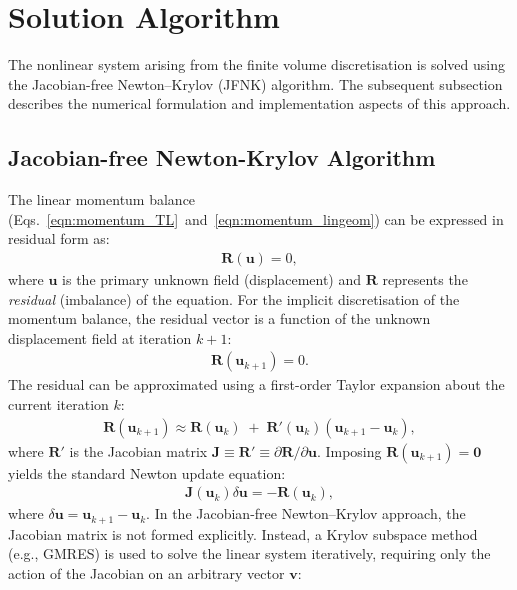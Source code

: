 \documentclass[review,3p]{elsarticle}
\newcommand{\bb}{\boldsymbol}
\begin{document}
\section{Solution Algorithm}
\label{sec:Sol_Alg}
%
%
The nonlinear system arising from the finite volume discretisation is solved using the Jacobian-free Newton–Krylov (JFNK) algorithm.
The subsequent subsection describes the numerical formulation and implementation aspects of this approach.
%
\subsection{Jacobian-free Newton-Krylov Algorithm}
\label{sec:JFNK_alg}
%
The linear momentum balance (Eqs.~\eqref{eqn:momentum_TL}~and~\eqref{eqn:momentum_lingeom}) can be expressed in residual form as:
%
\begin{eqnarray}
	\bb{R}(\bb{u}) = 0,
\end{eqnarray}
%
where $\bb{u}$ is the primary unknown field (displacement) and $\bb{R}$ represents the \emph{residual} (imbalance) of the equation.
For the implicit discretisation of the momentum balance, the residual vector is a function of the unknown displacement field at iteration $k+1$:
%
\begin{eqnarray}
	\bb{R}(\bb{u}_{k+1}) = 0.
\end{eqnarray}
%
The residual can be approximated using a first-order Taylor expansion about the current iteration $k$:
%
\begin{eqnarray}
	\bb{R}(\bb{u}_{k+1}) \approx \bb{R}(\bb{u}_{k}) \;+\;  \bb{R}'(\bb{u}_{k}) (\bb{u}_{k+1} - \bb{u}_{k}),
\end{eqnarray}
%
where $\bb{R}'$ is the Jacobian matrix $\bb{J}\equiv\bb{R}'\equiv\partial \bb{R} / \partial \bb{u}$.
Imposing $\bb{R}(\bb{u}_{k+1}) = \bb{0}$ yields the standard Newton update equation:
%
\begin{eqnarray}
	\bb{J}(\bb{u}_k) \delta \bb{u} = -\bb{R}(\bb{u}_k),
\end{eqnarray}
%
where $\delta \bb{u}=\bb{u}_{k+1} - \bb{u}_{k}$.
In the Jacobian-free Newton–Krylov approach, the Jacobian matrix is not formed explicitly.
Instead, a Krylov subspace method (e.g., GMRES) is used to solve the linear system iteratively, requiring only the action of the Jacobian on an arbitrary vector $\bb{v}$:
\end{document}
